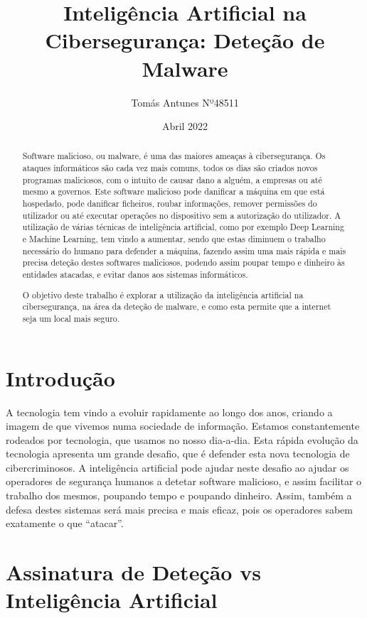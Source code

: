 \documentclass[10pt]{article}
\title{Inteligência Artificial na Cibersegurança: Deteção de Malware}
\author{Tomás Antunes Nº48511}
\date{Abril 2022}
\begin{document}
\maketitle

\begin{abstract}

Software malicioso, ou malware, é uma das maiores ameaças à cibersegurança. Os ataques informáticos são cada vez mais comuns, todos os dias são criados novos programas maliciosos, com o intuito de causar dano a alguém, a empresas ou até mesmo a governos. Este software malicioso pode danificar a máquina em que está hospedado, pode danificar ficheiros, roubar informações, remover permissões do utilizador ou até executar operações no dispositivo sem a autorização do utilizador. A utilização de várias técnicas de inteligência artificial, como por exemplo Deep Learning e Machine Learning, tem vindo a aumentar, sendo que estas diminuem o trabalho necessário do humano para defender a máquina, fazendo assim uma mais rápida e mais precisa deteção destes softwares maliciosos, podendo assim poupar tempo e dinheiro às entidades atacadas, e evitar danos aos sistemas informáticos. 

O objetivo deste trabalho é explorar a utilização da inteligência artificial na cibersegurança, na área da deteção de malware, e como esta permite que a internet seja um local mais seguro.

\end{abstract}
\newpage

\section{Introdução}

A tecnologia tem vindo a evoluir rapidamente ao longo dos anos, criando a imagem de que vivemos numa sociedade de informação. Estamos constantemente rodeados por tecnologia, que usamos no nosso dia-a-dia. Esta rápida evolução da tecnologia apresenta um grande desafio, que é defender esta nova tecnologia de cibercriminosos. A inteligência artificial pode ajudar neste desafio ao ajudar os operadores de segurança humanos a detetar software malicioso, e assim facilitar o trabalho dos mesmos, poupando tempo e poupando dinheiro. Assim, também a defesa destes sistemas será mais precisa e mais eficaz, pois os operadores sabem exatamente o que “atacar”.


\section{Assinatura de Deteção vs Inteligência Artificial}
\end{document}
